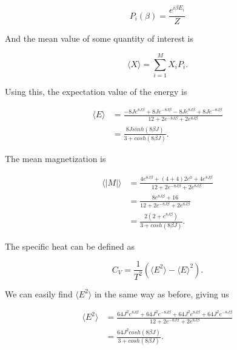 \documentclass[%
oneside,                 %
final,                   %
10pt]{article}
\begin{document}
\begin{equation*}
P_i(\beta)= \frac{e^{i \beta E_i}}{Z}
\end{equation*}

And the mean value of some quantity of interest is 

\begin{equation*}
\langle X \rangle = \sum_{i=1}^M X_i P_i.
\end{equation*}

Using this, the expectation value of the energy is 

\begin{equation*}
\begin{split}
\langle E \rangle & = \frac{-8J e^{8 J \beta}+8J e^{-8 J \beta} -8J e^{8 J \beta} + 8J e^{-8 J \beta}}{12+2e^{-8 J \beta} + 2e^{8 J \beta}} \\
& = \frac{8 J sinh(8 \beta J)}{3 + cosh(8 \beta J)}.
\end{split}
\end{equation*}

The mean magnetization is

\begin{equation*}
\begin{split}
\langle |M| \rangle & = \frac{4 e^{8 J \beta}+(4+4)2 e^{0} + 4 e^{8 J \beta} }{12+2e^{-8 J \beta} + 2e^{8 J \beta}} \\
& = \frac{8e^{8 J \beta}+16}{12+2e^{-8 J \beta} + 2e^{8 J \beta}} \\
& = \frac{2(2+e^{8 J \beta})}{3 + cosh(8 \beta J)}.
\end{split}
\end{equation*}

The specific heat can be defined as 

\begin{equation*}
C_V=\frac{1}{T^2} (\langle E^2 \rangle - \langle E \rangle ^2).
\end{equation*}

We can easily find $\langle E^2 \rangle$ in the same way as before, giving us

\begin{equation*}
\begin{split}
\langle E^2 \rangle & = \frac{64J^2 e^{8 J \beta}+64J^2 e^{-8 J \beta} +64J^2 e^{8 J \beta} + 64J^2 e^{-8 J \beta}}{12+2e^{-8 J \beta} + 2e^{8 J \beta}} \\
& = \frac{64 J^2 cosh(8 \beta J)}{3 + cosh(8 \beta J)}.
\end{split}
\end{equation*}
\end{document}
